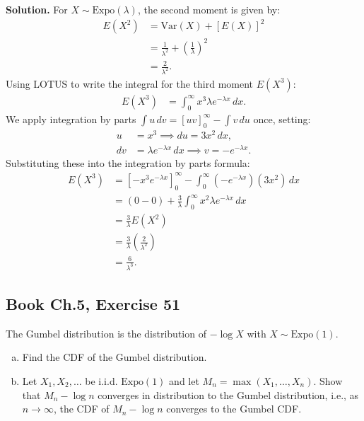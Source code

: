 \documentclass[11pt,a4paper]{article}
\begin{document}
\noindent \textbf{Solution.} For $X \sim \text{Expo}(\lambda)$, the second moment is given by:
\begin{align*}
E(X^2) &= \text{Var}(X) + [E(X)]^2 \\
&= \frac{1}{\lambda^2} + \left(\frac{1}{\lambda}\right)^2 \\
&= \frac{2}{\lambda^2}.
\end{align*}
Using LOTUS to write the integral for the third moment $E(X^3)$:
\begin{align*}
E(X^3) &= \int_{0}^{\infty} x^3 \lambda e^{-\lambda x} \, dx.
\end{align*}
We apply integration by parts $\int u \, dv = [uv]_0^\infty - \int v \, du$ once, setting:
\begin{align*}
u &= x^3 \implies du = 3x^2 \, dx, \\
dv &= \lambda e^{-\lambda x} \, dx \implies v = -e^{-\lambda x}.
\end{align*}
Substituting these into the integration by parts formula:
\begin{align*}
E(X^3) &= \left[ -x^3 e^{-\lambda x} \right]_{0}^{\infty} - \int_{0}^{\infty} \left(-e^{-\lambda x}\right) \left(3x^2\right) \, dx \\
&= (0 - 0) + \frac{3}{\lambda} \int_{0}^{\infty} x^2 \lambda e^{-\lambda x} \, dx \\
&= \frac{3}{\lambda} E(X^2) \\
&= \frac{3}{\lambda} \left( \frac{2}{\lambda^2} \right) \\
&= \frac{6}{\lambda^3}.
\end{align*}

\vspace{10pt}
\subsection{Book Ch.5, Exercise 51}
\begin{tcolorbox}[title={Book Ch.5, Exercise 51}]
The Gumbel distribution is the distribution of $-\log X$ with $X \sim \text{Expo}(1)$.
\begin{enumerate}[(a)]
\item Find the CDF of the Gumbel distribution.
\item Let $X_1, X_2, \dots$ be i.i.d. $\text{Expo}(1)$ and let $M_n = \max(X_1, \dots, X_n)$. Show that $M_n - \log n$ converges in distribution to the Gumbel distribution, i.e., as $n \rightarrow \infty$, the CDF of $M_n - \log n$ converges to the Gumbel CDF.
\end{enumerate}
\end{tcolorbox}
\end{document}
